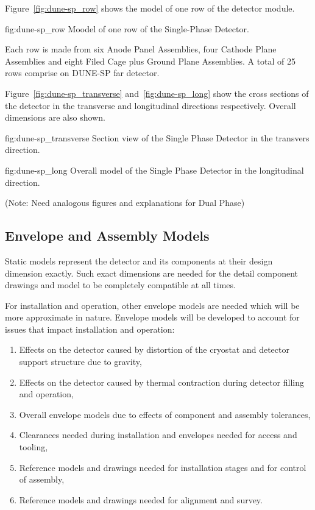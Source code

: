 Figure~\ref{fig:dune-sp_row} shows the model of one row of the
detector module.
\begin{dunefigure}{fig:dune-sp_row}
  {Moodel of one row of the Single-Phase Detector.}
\end{dunefigure}
Each row is made from six Anode Panel Assemblies,
four Cathode Plane Assemblies and eight Filed Cage plus Ground Plane
Assemblies. A total of 25 rows comprise on DUNE-SP far detector.

Figure~\ref{fig:dune-sp_transverse} and~\ref{fig:dune-sp_long} show
the cross sections of the detector in the transverse and longitudinal
directions respectively. Overall dimensions are also shown.
\begin{dunefigure}{fig:dune-sp_transverse}
  {Section view of the Single Phase Detector in the transvers direction.}
\end{dunefigure}
\begin{dunefigure}{fig:dune-sp_long}
  {Overall model of the Single Phase Detector in the longitudinal direction.}
\end{dunefigure}

(Note: Need analogous figures and explanations for Dual Phase)

\subsection{Envelope and Assembly Models}
\label{sec:fdsp-coord-integ-envelope}
Static models represent the detector and its components at their
design dimension exactly. Such exact dimensions are needed for the
detail component drawings and model to be completely compatible at all
times.

For installation and operation, other envelope models are needed which
will be more approximate in nature. Envelope models will be developed
to account for issues that impact installation and operation:
\begin{enumerate}
 \item Effects on the detector caused by distortion of the cryostat
   and detector support structure due to gravity,
 \item Effects on the detector caused by thermal contraction during
   detector filling and operation,
 \item Overall envelope models due to effects of component and
   assembly tolerances,
 \item Clearances needed during installation and envelopes needed for
   access and tooling,
 \item Reference models and drawings needed for installation stages
   and for control of assembly,
 \item Reference models and drawings needed for alignment and survey.
\end{enumerate}


